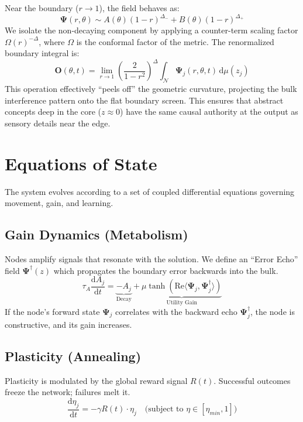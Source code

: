 \documentclass{article}
\newcommand{\D}{\mathrm{d}}
\begin{document}
Near the boundary ($r \to 1$), the field behaves as:
\begin{equation}
    \mathbf{\Psi}(r, \theta) \sim A(\theta)(1-r)^{\Delta_-} + B(\theta)(1-r)^{\Delta_+}
\end{equation}
We isolate the non-decaying component by applying a counter-term scaling factor $\Omega(r)^{-\Delta}$, where $\Omega$ is the conformal factor of the metric. The renormalized boundary integral is:
\begin{equation}
    \mathbf{O}(\theta, t) = \lim_{r \to 1} \left( \frac{2}{1-r^2} \right)^{\Delta} \int_{\mathcal{N}} \mathbf{\Psi}_j(r, \theta, t) \, \D \mu(z_j)
\end{equation}
This operation effectively ``peels off'' the geometric curvature, projecting the bulk interference pattern onto the flat boundary screen. This ensures that abstract concepts deep in the core ($z \approx 0$) have the same causal authority at the output as sensory details near the edge.

\section{Equations of State}
The system evolves according to a set of coupled differential equations governing movement, gain, and learning.

\subsection{Gain Dynamics (Metabolism)}
Nodes amplify signals that resonate with the solution. We define an ``Error Echo'' field $\mathbf{\Psi}^\dagger(z)$ which propagates the boundary error backwards into the bulk.
\begin{equation}
    \tau_A \frac{\D A_j}{\D t} = \underbrace{-A_j}_{\text{Decay}} + \underbrace{\mu \tanh\left( \text{Re}\langle \mathbf{\Psi}_j, \mathbf{\Psi}^\dagger_j \rangle \right)}_{\text{Utility Gain}}
\end{equation}
If the node's forward state $\mathbf{\Psi}_j$ correlates with the backward echo $\mathbf{\Psi}^\dagger_j$, the node is constructive, and its gain increases.

\subsection{Plasticity (Annealing)}
Plasticity is modulated by the global reward signal $R(t)$. Successful outcomes freeze the network; failures melt it.
\begin{equation}
    \frac{\D \eta_j}{\D t} = -\gamma R(t) \cdot \eta_j \quad \text{(subject to } \eta \in [\eta_{min}, 1]\text{)}
\end{equation}
\end{document}
